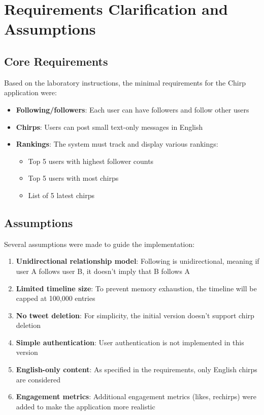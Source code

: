 \documentclass[a4paper,11pt]{article}
\begin{document}
\newpage
\section{Requirements Clarification and Assumptions}

\subsection{Core Requirements}
Based on the laboratory instructions, the minimal requirements for the Chirp application were:

\begin{itemize}
    \item \textbf{Following/followers}: Each user can have followers and follow other users
    \item \textbf{Chirps}: Users can post small text-only messages in English
    \item \textbf{Rankings}: The system must track and display various rankings:
    \begin{itemize}
        \item Top 5 users with highest follower counts
        \item Top 5 users with most chirps
        \item List of 5 latest chirps
    \end{itemize}
\end{itemize}

\subsection{Assumptions}
Several assumptions were made to guide the implementation:

\begin{enumerate}
    \item \textbf{Unidirectional relationship model}: Following is unidirectional, meaning if user A follows user B, it doesn't imply that B follows A
    \item \textbf{Limited timeline size}: To prevent memory exhaustion, the timeline will be capped at 100,000 entries
    \item \textbf{No tweet deletion}: For simplicity, the initial version doesn't support chirp deletion
    \item \textbf{Simple authentication}: User authentication is not implemented in this version
    \item \textbf{English-only content}: As specified in the requirements, only English chirps are considered
    \item \textbf{Engagement metrics}: Additional engagement metrics (likes, rechirps) were added to make the application more realistic
\end{enumerate}
\end{document}
